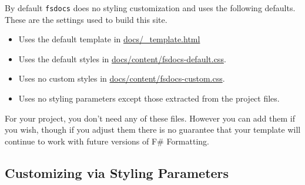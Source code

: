 \documentclass{article}
\begin{document}
By default \texttt{fsdocs} does no styling customization and uses the following defaults. These are the settings used to build this site.
\begin{itemize}
\item 

Uses the default template in \href{https://github.com/fsprojects/FSharp.Formatting/blob/master/docs/\_template.html}{docs/\_template.html}

\item 

Uses the default styles in \href{https://github.com/fsprojects/FSharp.Formatting/blob/master/docs/content/fsdocs-default.css}{docs/content/fsdocs-default.css}.

\item 

Uses no custom styles in \href{https://github.com/fsprojects/FSharp.Formatting/blob/master/docs/content/fsdocs-default.css}{docs/content/fsdocs-custom.css}.

\item 

Uses no styling parameters except those extracted from the project files.

\end{itemize}



For your project, you don't need any of these files. However you can add them if you wish, though if
you adjust them there is no guarantee that your template will continue to work with future versions of F\# Formatting.
\subsection*{Customizing via Styling Parameters}
\end{document}
